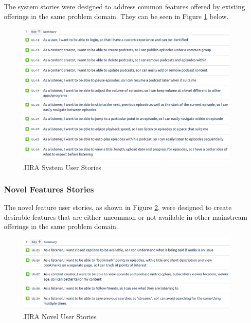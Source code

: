 \documentclass[12pt]{article}
\begin{document}
The system stories were designed to address common features offered by existing offerings in the same problem domain. 
They can be seen in Figure \ref{fig:jira_system_user_stories} below.

\begin{figure}[ht]
    \centering
    \includegraphics[width=\textwidth]{resources/system_stories}
    \caption{JIRA System User Stories}
    \label{fig:jira_system_user_stories}
\end{figure}

\newpage
\subsubsection{Novel Features Stories} \label{sec:novel_features_stories}

The novel feature user stories, as shown in Figure \ref{fig:jira_novel_user_stories}, were designed to create desirable features that are either uncommon or not 
available in other mainstream offerings in the same problem domain.

\begin{figure}[h]
    \centering
    \includegraphics[width=\textwidth]{resources/novel_stories}
    \caption{JIRA Novel User Stories}
    \label{fig:jira_novel_user_stories}
\end{figure}
\end{document}
